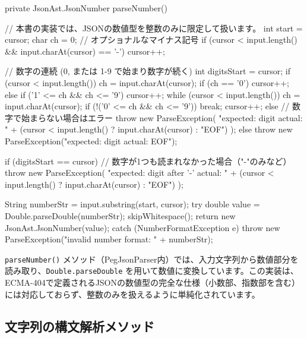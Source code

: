 \begin{codescreen}{}
    private JsonAst.JsonNumber parseNumber() {
        // 本書の実装では、JSONの数値型を整数のみに限定して扱います。
        int start = cursor;
        char ch = 0;
        // オプショナルなマイナス記号
        if (cursor < input.length() && input.charAt(cursor) == '-') {
            cursor++;
        }

        // 数字の連続 (0, または 1-9 で始まり数字が続く)
        int digitsStart = cursor;
        if (cursor < input.length()) {
            ch = input.charAt(cursor);
            if (ch == '0') {
                cursor++;
            } else if ('1' <= ch && ch <= '9') {
                cursor++;
                while (cursor < input.length()) {
                    ch = input.charAt(cursor);
                    if (!('0' <= ch && ch <= '9')) break;
                    cursor++;
                }
            } else {
                // 数字で始まらない場合はエラー
                throw new ParseException(
                    "expected: digit actual: " + 
                    (cursor < input.length() ? input.charAt(cursor) : "EOF")
                );
            }
        } else {
             throw new ParseException("expected: digit actual: EOF");
        }

        if (digitsStart == cursor) {
             // 数字が1つも読まれなかった場合（"-"のみなど）
             throw new ParseException(
                "expected: digit after '-' actual: " + 
                (cursor < input.length() ? input.charAt(cursor) : "EOF")
             );
        }
        
        String numberStr = input.substring(start, cursor);
        try {
            double value = Double.parseDouble(numberStr);
            skipWhitespace();
            return new JsonAst.JsonNumber(value);
        } catch (NumberFormatException e) {
            throw new ParseException("invalid number format: " + numberStr);
        }
    }
\end{codescreen}

\texttt{parseNumber()}
メソッド（PegJsonParser内）では、入力文字列から数値部分を読み取り、\texttt{Double.parseDouble}
を用いて数値に変換しています。この実装は、ECMA-404で定義されるJSONの数値型の完全な仕様（小数部、指数部を含む）には対応しておらず、整数のみを扱えるように単純化されています。

\subsection{文字列の構文解析メソッド}

